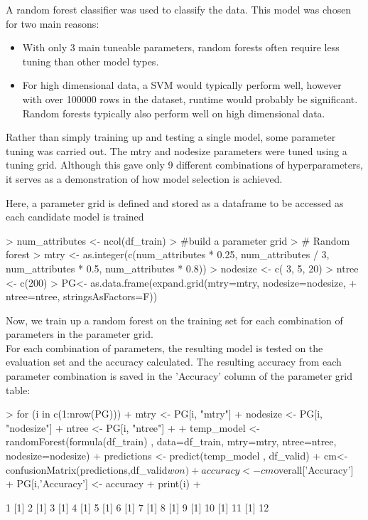\documentclass[10pt]{article}
\begin{document}
A random forest classifier was used to classify the data. This model was chosen for two main reasons:
\begin{itemize}
  \item With only 3 main tuneable parameters, random forests often require less tuning than other model types.
  \item For high dimensional data, a SVM would typically perform well, however with over 100000 rows in the dataset, runtime would probably be significant. Random forests typically also perform well on high dimensional data.
\end{itemize}


Rather than simply training up and testing a single model, some parameter tuning was carried out. The mtry and nodesize parameters were tuned using a tuning grid. Although this gave only 9 different combinations of hyperparameters, it serves as a demonstration of how model selection is achieved.

Here, a parameter grid is defined and stored as a dataframe to be accessed as each candidate model is trained
\begin{Schunk}
\begin{Sinput}
> num_attributes <- ncol(df_train)
> #build a parameter grid
> # Random forest
> mtry <- as.integer(c(num_attributes * 0.25, num_attributes / 3, num_attributes * 0.5, num_attributes * 0.8))
> nodesize <- c( 3, 5, 20)
> ntree <- c(200)
> PG<- as.data.frame(expand.grid(mtry=mtry, nodesize=nodesize,
+                                          ntree=ntree, stringsAsFactors=F))
\end{Sinput}
\end{Schunk}
Now, we train up a random forest on the training set for each combination of parameters in the parameter grid. \\
For each combination of parameters, the resulting model is tested on the evaluation set and the accuracy calculated.
The resulting accuracy from each parameter combination is saved in the 'Accuracy' column of the parameter grid table:
\begin{Schunk}
\begin{Sinput}
> for (i in c(1:nrow(PG))){
+   mtry <- PG[i, "mtry"]
+   nodesize <- PG[i, "nodesize"]
+   ntree <- PG[i, "ntree"]
+ 
+   temp_model <- randomForest(formula(df_train) , data=df_train, mtry=mtry, ntree=ntree, nodesize=nodesize)
+   predictions <- predict(temp_model , df_valid)
+   cm<- confusionMatrix(predictions,df_valid$won)
+   accuracy <- cm$overall['Accuracy']
+   PG[i,'Accuracy'] <- accuracy
+   print(i)
+ }
\end{Sinput}
\begin{Soutput}
[1] 1
[1] 2
[1] 3
[1] 4
[1] 5
[1] 6
[1] 7
[1] 8
[1] 9
[1] 10
[1] 11
[1] 12
\end{Soutput}
\end{Schunk}
\end{document}
